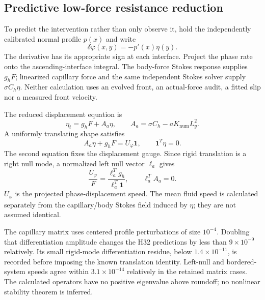 \subsection{Predictive low-force resistance reduction}
To predict the intervention rather than only observe it, hold the
independently calibrated normal profile $p(x)$ and write
\begin{equation}
 \delta\varphi(x,y)=-p'(x)\eta(y).
\end{equation}
The derivative has its appropriate sign at each interface.
Project the phase rate onto the ascending-interface integral.
The body-force Stokes response supplies $g_hF$; linearized capillary force
and the same independent Stokes solver supply $\sigma C_h\eta$.
Neither calculation uses an evolved front, an actual-force audit,
a fitted slip nor a measured front velocity.

The reduced displacement equation is
\begin{equation}\label{eq:reducedphase}
 \eta_t=g_hF+A_a\eta,\qquad
 A_a=\sigma C_h-aK_{\mathrm{num}}L_y^2 .
\end{equation}
A uniformly translating shape satisfies
\begin{equation}\label{eq:steadymobility}
 A_a\eta+g_hF=U_\varphi\bm1,\qquad \bm1^T\eta=0.
\end{equation}
The second equation fixes the displacement gauge.
Since rigid translation is a right null mode, a normalized left null vector
$\ell_a$ gives
\begin{equation}\label{eq:leftmobility}
 \frac{U_\varphi}{F}
 =\frac{\ell_a^Tg_h}{\ell_a^T\bm1},\qquad \ell_a^TA_a=0.
\end{equation}
$U_\varphi$ is the projected phase-displacement speed.
The mean fluid speed is calculated separately from the capillary/body
Stokes field induced by $\eta$; they are not assumed identical.

The capillary matrix uses centered profile perturbations of size $10^{-4}$.
Doubling that differentiation amplitude changes the H32 predictions by
less than $9\times10^{-9}$ relatively. Its small rigid-mode differentiation
residue, below $1.4\times10^{-11}$, is recorded before imposing the known
translation identity. Left-null and bordered-system speeds agree within
$3.1\times10^{-14}$ relatively in the retained matrix cases.
The calculated operators have no positive eigenvalue above roundoff;
no nonlinear stability theorem is inferred.

